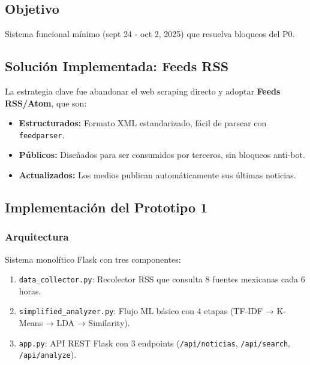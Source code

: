 \subsection{Objetivo}
Sistema funcional mínimo (sept 24 - oct 2, 2025) que resuelva bloqueos del P0.

\subsection{Solución Implementada: Feeds RSS}
La estrategia clave fue abandonar el web scraping directo y adoptar \textbf{Feeds RSS/Atom}, que son:
\begin{itemize}
    \item \textbf{Estructurados:} Formato XML estandarizado, fácil de parsear con \texttt{feedparser}.
    \item \textbf{Públicos:} Diseñados para ser consumidos por terceros, sin bloqueos anti-bot.
    \item \textbf{Actualizados:} Los medios publican automáticamente sus últimas noticias.
\end{itemize}

\subsection{Implementación del Prototipo 1}

\subsubsection{Arquitectura}
Sistema monolítico Flask con tres componentes:
\begin{enumerate}
    \item \texttt{data\_collector.py}: Recolector RSS que consulta 8 fuentes mexicanas cada 6 horas.
    \item \texttt{simplified\_analyzer.py}: Flujo ML básico con 4 etapas (TF-IDF → K-Means → LDA → Similarity).
    \item \texttt{app.py}: API REST Flask con 3 endpoints (\texttt{/api/noticias}, \texttt{/api/search}, \texttt{/api/analyze}).
\end{enumerate}

